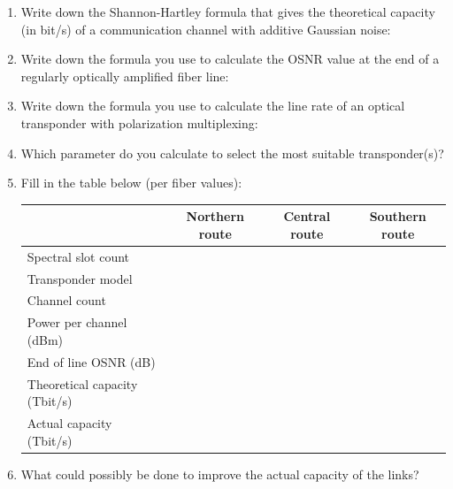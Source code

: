 \documentclass[a4paper,11pt]{article}
\begin{document}
\begin{enumerate}
    \item Write down the Shannon-Hartley formula that gives the theoretical capacity (in bit/s) of a communication channel with additive Gaussian noise:
    
    \vspace{2cm}
    
    \item Write down the formula you use to calculate the OSNR value at the end of a regularly optically amplified fiber line:
    
    \vspace{2cm}
    
    \item Write down the formula you use to calculate the line rate of an optical transponder with polarization multiplexing:
    
    \vspace{2cm}
    
    \item Which parameter do you calculate to select the most suitable transponder(s)?
    
    \vspace{2cm}
    
    \item Fill in the table below (per fiber values):
    
    \begin{table}[h]
    \centering
    \begin{tabular}{lccc}
    \toprule
    & \textbf{Northern route} & \textbf{Central route} & \textbf{Southern route} \\
    \midrule
    Spectral slot count & & & \\
    Transponder model & & & \\
    Channel count & & & \\
    Power per channel (dBm) & & & \\
    End of line OSNR (dB) & & & \\
    Theoretical capacity (Tbit/s) & & & \\
    Actual capacity (Tbit/s) & & & \\
    \bottomrule
    \end{tabular}
    \end{table}
    
    \item What could possibly be done to improve the actual capacity of the links?
    
    \vspace{3cm}
\end{enumerate}
\end{document}
